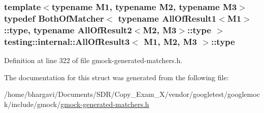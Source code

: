 \subsubsection[{\texorpdfstring{type}{type}}]{\setlength{\rightskip}{0pt plus 5cm}template$<$typename M1, typename M2, typename M3$>$ typedef {\bf Both\+Of\+Matcher}$<$ typename {\bf All\+Of\+Result1}$<$M1$>$\+::{\bf type}, typename {\bf All\+Of\+Result2}$<$M2, M3$>$\+::{\bf type} $>$ {\bf testing\+::internal\+::\+All\+Of\+Result3}$<$ M1, M2, M3 $>$\+::{\bf type}}\hypertarget{structtesting_1_1internal_1_1_all_of_result3_a18073a23acd542bccf3a6c5d7f72f957}{}\label{structtesting_1_1internal_1_1_all_of_result3_a18073a23acd542bccf3a6c5d7f72f957}


Definition at line 322 of file gmock-\/generated-\/matchers.\+h.



The documentation for this struct was generated from the following file\+:\begin{DoxyCompactItemize}
\item 
/home/bhargavi/\+Documents/\+S\+D\+R/\+Copy\+\_\+\+Exam\+\_\+X/vendor/googletest/googlemock/include/gmock/\hyperlink{gmock-generated-matchers_8h}{gmock-\/generated-\/matchers.\+h}\end{DoxyCompactItemize}
